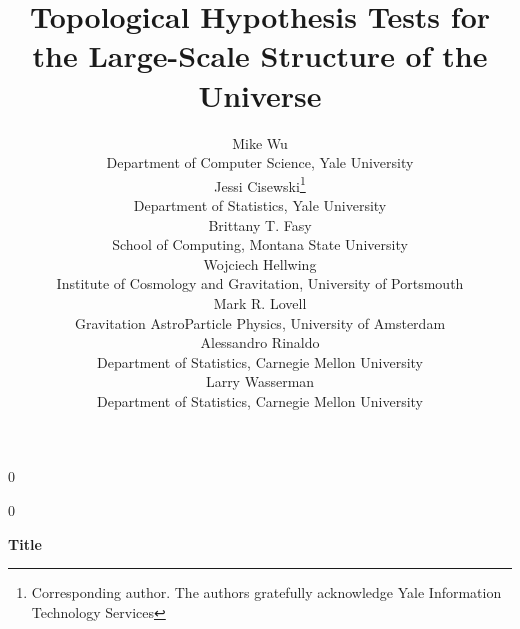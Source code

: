 \documentclass[12pt]{article}
\newcommand{\blind}{0}
\begin{document}
%

\def\spacingset#1{\renewcommand{\baselinestretch}%
{#1}\small\normalsize} \spacingset{1}



\blind
{
  \title{\bf Topological Hypothesis Tests for the Large-Scale Structure of the Universe}
  \author{Mike Wu\\
    Department of Computer Science, Yale University \\
    Jessi Cisewski\thanks{
    Corresponding author.  The authors gratefully acknowledge Yale Information Technology Services}\hspace{.2cm} \\
    Department of Statistics, Yale University \\
    Brittany T. Fasy\\
School of Computing, Montana State University \\
    Wojciech Hellwing \\
    Institute of Cosmology and Gravitation, University of Portsmouth \\
    Mark R. Lovell\\
    Gravitation AstroParticle Physics, University of Amsterdam \\
    Alessandro Rinaldo\\
    Department of Statistics, Carnegie Mellon University \\
    Larry Wasserman\\
    Department of Statistics, Carnegie Mellon University \\
  }
  \maketitle
} \fi

\blind
{
  \bigskip
  \begin{center}
    {\LARGE\bf Title}
\end{center}
  \medskip
} \fi

\end{document}
